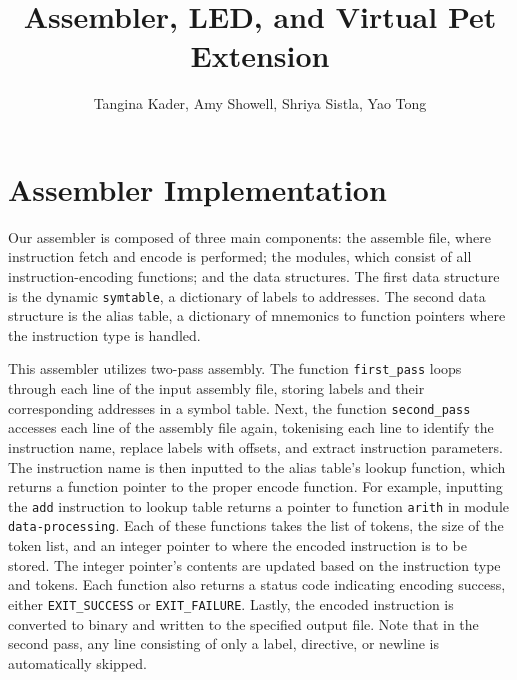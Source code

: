 \documentclass[11pt]{article}
\begin{document}
\title{Assembler, LED, and Virtual Pet Extension}
\author{Tangina Kader, Amy Showell, Shriya Sistla, Yao Tong}

\maketitle

\section{Assembler Implementation}

Our assembler is composed of three main components: the assemble file, where
instruction fetch and encode is performed; the modules, which consist of 
all instruction-encoding functions; and the data structures. The first data 
structure is the dynamic \texttt{symtable}, a dictionary of labels to addresses. 
The second data structure is the alias table, a dictionary of mnemonics to 
function pointers where the instruction type is handled. 

This assembler utilizes two-pass assembly. The function \texttt{first\_pass} 
loops through each line of the input assembly file, storing labels and their 
corresponding addresses in a symbol table. Next, the function 
\texttt{second\_pass} accesses each line of the assembly file again, tokenising each 
line to identify the instruction name, replace labels with offsets, and 
extract instruction parameters. The instruction name is then inputted to the alias
table's lookup function, which returns a function pointer to the proper encode function. 
For example, inputting the \texttt{add} instruction to lookup table 
returns a pointer to function \texttt{arith} in module \texttt{data-processing}. 
Each of these functions takes the list of tokens, the size of the token list, 
and an integer pointer to where the encoded instruction is to be stored. The integer 
pointer's contents are updated based on the instruction type and tokens. 
Each function also returns a status code indicating encoding success, either 
\texttt{EXIT\_SUCCESS} or \texttt{EXIT\_FAILURE}. Lastly, the encoded instruction
is converted to binary and written to the specified output file. 
Note that in the second pass, any line consisting of only a label, directive, 
or newline is automatically skipped. 
\end{document}
